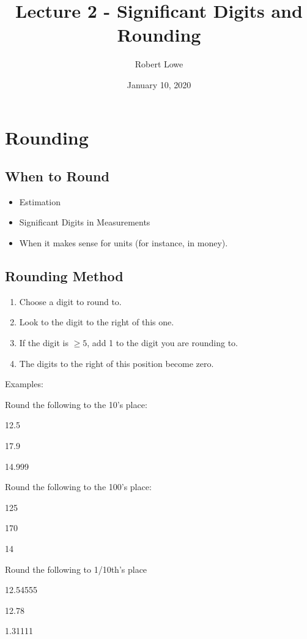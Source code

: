 \documentclass{article}
\title{Lecture 2 - Significant Digits and Rounding}
\author{Robert Lowe}
\date{January 10, 2020}
\begin{document}
\maketitle

\section{Rounding}
\subsection{When to Round}
\begin{itemize}
    \item Estimation
    \item Significant Digits in Measurements
    \item When it makes sense for units (for instance, in money).
\end{itemize}

\subsection{Rounding Method}
\begin{enumerate}
    \item Choose a digit to round to.
    \item Look to the digit to the right of this one.
    \item If the digit is $\geq 5$, add 1 to the digit you are rounding to.
    \item The digits to the right of this position become zero.
\end{enumerate}
Examples:

Round the following to the 10's place:
\begin{enumerate*}[label=\ \ (\alph*)]
    \item 12.5 
    \item 17.9
    \item 14.999
\end{enumerate*}

Round the following to the 100's place:
\begin{enumerate*}[label=\ \ (\alph*)]
    \item 125
    \item 170
    \item 14
\end{enumerate*}

Round the following to 1/10th's place
\begin{enumerate*}[label=\ \ (\alph*)]
    \item 12.54555
    \item 12.78
    \item 1.31111
\end{enumerate*}
\end{document}
